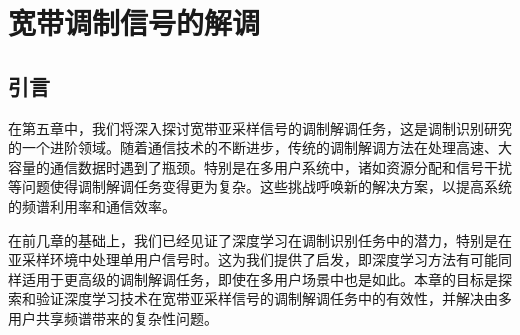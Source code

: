 \chapter{宽带调制信号的解调}\label{chap:intro}










\section{引言}\label{sec:background}
在第五章中，我们将深入探讨宽带亚采样信号的调制解调任务，这是调制识别研究的一个进阶领域。随着通信技术的不断进步，传统的调制解调方法在处理高速、大容量的通信数据时遇到了瓶颈。特别是在多用户系统中，诸如资源分配和信号干扰等问题使得调制解调任务变得更为复杂。这些挑战呼唤新的解决方案，以提高系统的频谱利用率和通信效率。

在前几章的基础上，我们已经见证了深度学习在调制识别任务中的潜力，特别是在亚采样环境中处理单用户信号时。这为我们提供了启发，即深度学习方法有可能同样适用于更高级的调制解调任务，即使在多用户场景中也是如此。本章的目标是探索和验证深度学习技术在宽带亚采样信号的调制解调任务中的有效性，并解决由多用户共享频谱带来的复杂性问题。

